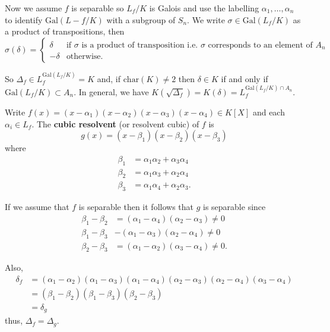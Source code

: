 \documentclass[12pt, a4paper]{article}
\newcommand{\gal}{\text{Gal}}
\begin{document}
Now we assume \(f\) is separable so \(L_f/K\) is Galois and use the labelling \(\alpha_1,\ldots,\alpha_n\) to identify \(\gal(L-f/K)\) with a subgroup of \(S_n\). We write \(\sigma \in \gal(L_f/K)\) as a product of transpositions, then 
\[\sigma(\delta) = \begin{cases}
    \delta &\text{if } \sigma \text{ is a product of transposition i.e.\ } \sigma \text{ corresponds to an element of } A_n\\
    -\delta &\text{otherwise}.
\end{cases}\]

So \(\Delta_f \in L_f^{\gal(L_f/K)} = K\) and, if \(\text{char}(K)\neq 2\) then \(\delta \in K\) if and only if \(\gal(L_f/K) \subset A_n\). In general, we have \(K(\sqrt{\Delta_f}) = K(\delta)=L_f^{\gal(L_f/K)\cap A_n}\). 

\begin{definition}
    Write \(f(x)=(x-\alpha_1)(x-\alpha_2)(x-\alpha_3)(x-\alpha_4) \in K[X]\) and each \(\alpha_i \in L_f\). The \textbf{cubic resolvent} (or resolvent cubic) of \(f\) is 
    \[g(x)= (x-\beta_1)(x-\beta_2)(x-\beta_3)\]
    where 
    \[\begin{aligned}
        \beta_1 &= \alpha_1\alpha_2+\alpha_3\alpha_4 \\
        \beta_2 &= \alpha_1\alpha_3+\alpha_2\alpha_4 \\
        \beta_3 &= \alpha_1\alpha_4+\alpha_2\alpha_3.
    \end{aligned}\]
\end{definition}

If we assume that \(f\) is separable then it follows that \(g\) is separable since 
\[\begin{aligned}
    \beta_1-\beta_2 &= (\alpha_1-\alpha_4)(\alpha_2-\alpha_3) \neq 0 \\
    \beta_1-\beta_3 &- (\alpha_1-\alpha_3)(\alpha_2-\alpha_4) \neq 0 \\
    \beta_2-\beta_3 &= (\alpha_1-\alpha_2)(\alpha_3-\alpha_4) \neq 0.
\end{aligned}\]

Also, 
\[\begin{aligned}
    \delta_f &= (\alpha_1-\alpha_2)(\alpha_1-\alpha_3)(\alpha_1-\alpha_4)(\alpha_2-\alpha_3)(\alpha_2-\alpha_4)(\alpha_3-\alpha_4) \\
    &= (\beta_1-\beta_2)(\beta_1-\beta_3)(\beta_2-\beta_3) \\
    &=\delta_g
\end{aligned}\]
thus, \(\Delta_f = \Delta_g\).
\end{document}
